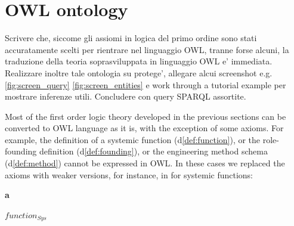 \documentclass[sw]{iosart2x}
\newcommand{\bflist}{\begin{list}{}{\setlength{\topsep}{2mm}\setlength{\partopsep}{0mm}\setlength{\parsep}{0mm}\setlength{\leftmargin}{9mm}\setlength{\labelwidth}{8mm}}}
\newcommand{\eflist}{\end{list}}
\newcommand{\AxLabel}{\textrm{a}}
\newcommand{\DefLabel}{\textrm{d}}
\newcounter{cntax}
\newcommand{\myax}[1]{\refstepcounter{cntax}\begin{small}{\bf \AxLabel\thecntax\label{ax:#1}}\end{small}}
\newcounter{cntdef}
\newcommand{\mydf}[1]{\refstepcounter{cntdef}\begin{small}{\bf \DefLabel\thecntdef\label{def:#1}}\end{small}}
\newcommand{\refdf}[1]{({\DefLabel}\ref{#1})}
\newcommand{\generalStyle}[1]{\texttt{#1}}
\newcommand{\biRel}[3]{\generalStyle{#1}(#2,#3)}
\newcommand{\myiff}{\Longleftrightarrow}
\newcommand{\OWL}{\textnormal{OWL}\xspace}
\newcommand{\DOLCEPart}[2]{\biRel{{P}}{#1}{#2}}
\newcommand{\DOLCEConstitutes}[2]{\biRel{{constitutes}}{#1}{#2}}
\newcommand{\DOLCEQualityDirect}[2]{\biRel{qt}{#1}{#2}}
\newcommand{\external}[2]{\biRel{externalTo}{#1}{#2}}
\newcommand{\internal}[2]{\biRel{internalTo}{#1}{#2}}
\newcommand{\TODO}[1]{{\color{red} #1}}
\newcommand{\TODOinline}[1]{{\color{red} #1}}
\begin{document}











\section{\TODOinline{OWL ontology}}\label{sec:appendice}
\TODO{Scrivere che, siccome gli assiomi in logica del primo ordine sono stati accuratamente scelti per rientrare nel linguaggio OWL, tranne forse alcuni, la traduzione della teoria soprasviluppata in linguaggio OWL e' immediata. 
Realizzare inoltre tale ontologia su protege', allegare alcui screenshot e.g. \ref{fig:screen_query} \ref{fig:screen_entities} e work through a tutorial example per mostrare inferenze utili. Concludere con query SPARQL assortite.}

\medskip
\TODO{Most of the first order logic theory developed in the previous sections can be converted to \OWL language as it is, with the exception of some axioms.
For example, the definition of a systemic function \refdf{def:function}, or the role-founding definition \refdf{def:founding}, or the engineering method schema \refdf{def:method} cannot be expressed in \OWL. 
In these cases we replaced the axioms with weaker versions, for instance, in for systemic functions:
\bflist
\item[\myax{functionOWL}] $function_{Sys}$
\eflist
}
\end{document}
